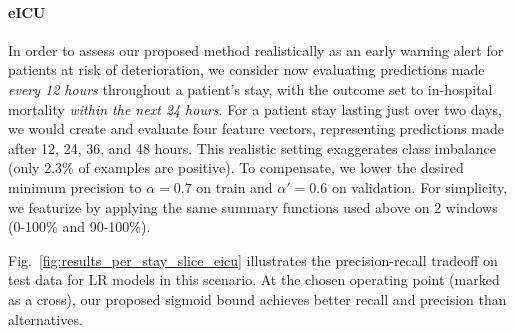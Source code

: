 \paragraph{eICU} In order to assess our proposed method realistically as an early warning alert for patients at risk of deterioration, we consider now evaluating predictions made \emph{every 12 hours} throughout a patient's stay, with the outcome set to in-hospital mortality \emph{within the next 24 hours}.
For a patient stay lasting just over two days, we would create and evaluate four feature vectors, representing predictions made after 12, 24, 36, and 48 hours.
This realistic setting exaggerates class imbalance (only 2.3\% of examples are positive). To compensate, we lower the desired minimum precision to $\alpha=0.7$ on train and $\alpha'=0.6$ on validation.
For simplicity, we featurize by applying the same summary functions used above on 2 windows (0-100\% and 90-100\%). 

Fig.~\ref{fig:results_per_stay_slice_eicu} illustrates the precision-recall tradeoff on test data for LR models in this scenario. At the chosen operating point (marked as a cross), our proposed sigmoid bound achieves better recall and precision than alternatives.